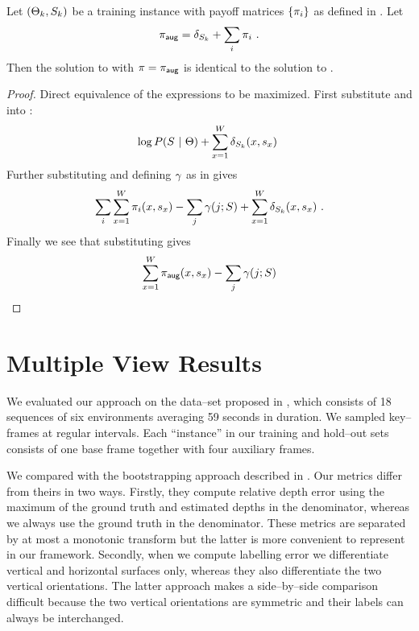 \begin{proposition}
  Let $(\Theta_k,S_k)$ be a training instance with payoff
  matrices $\{\pi_i\}$ as defined in .
  Let
  \begin{equation}
    \pi_{\textsf{aug}} = \delta_{S_k} + \sum_i \pi_i ~.
    \label{eq:aug-payoff}
  \end{equation}
  Then the solution to  with
  $\pi=\pi_{\textsf{aug}}$ is identical to the solution to
  .
\end{proposition}
\begin{proof}
  Direct equivalence of the expressions to be maximized. First
  substitute  and
   into :
  \begin{equation}
    \log P(S ~|~ \Theta) +
    \sum_{x=1}^{W} \delta_{S_k}(x,s_x) ~
  \end{equation}
  Further substituting  and defining
  $\gamma$ as in \cite{Flint11} gives
  \begin{equation}
    \sum_i \sum_{x=1}^{W} \pi_i(x,s_x) - 
    \sum_j \gamma(j;S) +
    \sum_{x=1}^{W} \delta_{S_k}(x,s_x) ~.
  \end{equation}
  Finally we see that substituting  gives
  \begin{equation}
    \sum_{x=1}^{W} \pi_{\textsf{aug}}(x,s_x) - 
    \sum_j \gamma(j;S)
  \end{equation}  
\end{proof}

\section{Multiple View Results}
\label{sec:mv-results}

We evaluated our approach on the data--set proposed in \cite{Flint11},
which consists of 18 sequences of six environments averaging 59
seconds in duration. We sampled key--frames at regular intervals. Each
``instance'' in our training and hold--out sets consists of one base
frame together with four auxiliary frames.

We compared with the bootstrapping approach described in
\cite{Flint11}. Our metrics differ from theirs in two ways. Firstly,
they compute relative depth error using the maximum of the ground
truth and estimated depths in the denominator, whereas we always use
the ground truth in the denominator. These metrics are separated by at
most a monotonic transform but the latter is more convenient to
represent in our framework. Secondly, when we compute labelling error
we differentiate vertical and horizontal surfaces only, whereas they
also differentiate the two vertical orientations. The latter approach
makes a side--by--side comparison difficult because the two vertical
orientations are symmetric and their labels can always be
interchanged.

